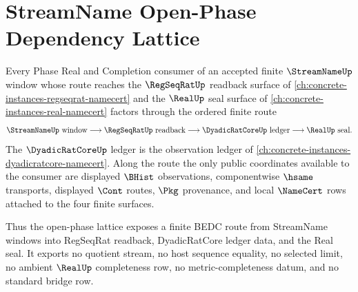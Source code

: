 \section{StreamName Open-Phase Dependency Lattice}
\label{sec:streamname-open-phase-dependency-lattice}

\begin{theorem}
\label{thm:streamname-regseqrat-real-open-phase-dependency-lattice}
Every Phase Real and Completion consumer of an accepted finite $\StreamNameUp$ window whose route reaches the $\RegSeqRatUp$ readback surface of \autoref{ch:concrete-instances-regseqrat-namecert} and the $\RealUp$ seal surface of \autoref{ch:concrete-instances-real-namecert} factors through the ordered finite route
$$
\StreamNameUp\text{ window}\longrightarrow \RegSeqRatUp\text{ readback}\longrightarrow \DyadicRatCoreUp\text{ ledger}\longrightarrow \RealUp\text{ seal}.
$$
The $\DyadicRatCoreUp$ ledger is the observation ledger of \autoref{ch:concrete-instances-dyadicratcore-namecert}. Along the route the only public coordinates available to the consumer are displayed $\BHist$ observations, componentwise $\hsame$ transports, displayed $\Cont$ routes, $\Pkg$ provenance, and local $\NameCert$ rows attached to the four finite surfaces.

Thus the open-phase lattice exposes a finite BEDC route from StreamName windows into RegSeqRat readback, DyadicRatCore ledger data, and the Real seal. It exports no quotient stream, no host sequence equality, no selected limit, no ambient $\RealUp$ completeness row, no metric-completeness datum, and no standard bridge row.
\end{theorem}
